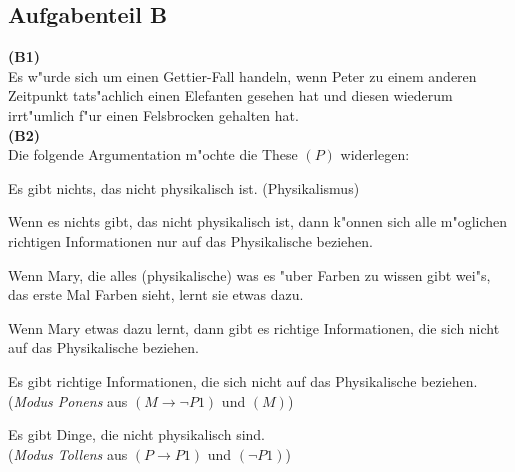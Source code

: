 \documentclass[a4paper]{article}
\begin{document}
\subsection*{Aufgabenteil B}

\noindent\textbf{(B1)}\\
\noindent Es w"urde sich um einen Gettier-Fall handeln, wenn Peter zu einem anderen Zeitpunkt tats"achlich einen Elefanten gesehen hat und diesen wiederum irrt"umlich f"ur einen Felsbrocken gehalten hat.\\

\noindent\textbf{(B2)}\\
\noindent Die folgende Argumentation m"ochte die These $(P)$ widerlegen:

\begin{description}[leftmargin=!,labelwidth=\widthof{\bfseries (M $\rightarrow \neg$P1)}]
  \item[(P)] Es gibt nichts, das nicht physikalisch ist. (Physikalismus)
  \item[(P $\rightarrow$ P1)] Wenn es nichts gibt, das nicht physikalisch ist, dann k"onnen sich alle m"oglichen richtigen Informationen nur auf das Physikalische beziehen.
  \item[(M)] Wenn Mary, die alles (physikalische) was es "uber Farben zu wissen gibt wei"s, das erste Mal Farben sieht, lernt sie etwas dazu.
  \item[(M $\rightarrow \neg$P1)] Wenn Mary etwas dazu lernt, dann gibt es richtige Informationen, die sich nicht auf das Physikalische beziehen.
  \item[($\neg$P1)] Es gibt richtige Informationen, die sich nicht auf das Physikalische beziehen.\\ (\emph{Modus Ponens} aus $(M \rightarrow \neg P1)$ und $(M)$)
  \item[(K)] Es gibt Dinge, die nicht physikalisch sind.\\ (\emph{Modus Tollens} aus $(P \rightarrow P1)$ und $(\neg P1)$)
\end{description}

\end{document}
